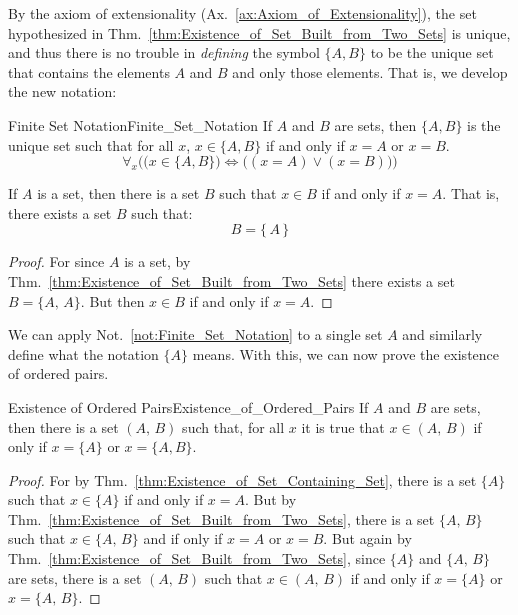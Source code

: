         By the axiom of extensionality
        (Ax.~\ref{ax:Axiom_of_Extensionality}), the set hypothesized in
        Thm.~\ref{thm:Existence_of_Set_Built_from_Two_Sets} is unique, and thus
        there is no trouble in \textit{defining} the symbol $\{A,B\}$ to be the
        unique set that contains the elements $A$ and $B$ and only those
        elements. That is, we develop the new notation:
        \begin{fnotation}{Finite Set Notation}{Finite_Set_Notation}
            If $A$ and $B$ are sets, then $\{A,B\}$ is the unique set such that
            for all $x$, $x\in\{A,B\}$ if and only if $x=A$ or $x=B$.
            \begin{equation*}
                \forall_{x}\Big(\big(x\in\{A,B\}\big)
                \Leftrightarrow\big((x=A)\lor(x=B)\big)\Big)
            \end{equation*}
        \end{fnotation}
        \begin{theorem}
            \label{thm:Existence_of_Set_Containing_Set}%
            If $A$ is a set, then there is a set $B$ such that $x\in{B}$ if
            and only if $x=A$. That is, there exists a set $B$ such that:
            \begin{equation}
                B=\{\,A\,\}
            \end{equation}
        \end{theorem}
        \begin{proof}
            For since $A$ is a set, by
            Thm.~\ref{thm:Existence_of_Set_Built_from_Two_Sets} there exists
            a set $B=\{A,\,A\}$. But then $x\in{B}$ if and only if $x=A$.
        \end{proof}
        We can apply Not.~\ref{not:Finite_Set_Notation} to a single set $A$ and
        similarly define what the notation $\{A\}$ means. With this, we can now
        prove the existence of ordered pairs.
        \begin{ltheorem}{Existence of Ordered Pairs}{Existence_of_Ordered_Pairs}
            If $A$ and $B$ are sets, then there is a set $(A,\,B)$ such that,
            for all $x$ it is true that $x\in(A,\,B)$ if only if $x=\{A\}$
            or $x=\{A,B\}$.
        \end{ltheorem}
        \begin{proof}
            For by Thm.~\ref{thm:Existence_of_Set_Containing_Set}, there is
            a set $\{A\}$ such that $x\in\{A\}$ if and only if $x=A$.
            But by Thm.~\ref{thm:Existence_of_Set_Built_from_Two_Sets}, there
            is a set $\{A,\,B\}$ such that $x\in\{A,\,B\}$ and if only
            if $x=A$ or $x=B$. But again by
            Thm.~\ref{thm:Existence_of_Set_Built_from_Two_Sets}, since
            $\{A\}$ and $\{A,\,B\}$ are sets, there is a set $(A,\,B)$ such
            that $x\in(A,\,B)$ if and only if $x=\{A\}$ or $x=\{A,\,B\}$.
        \end{proof}
